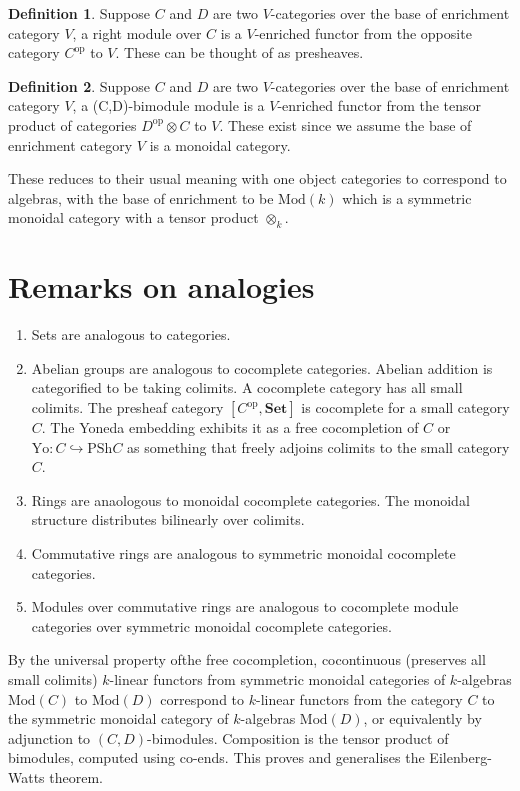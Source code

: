 \documentclass[10pt]{article}
\theoremstyle{plain}%
\theoremstyle{definition}
\newtheorem{definition}{Definition}[section]
\theoremstyle{remark}
\begin{document}
\begin{definition}
	Suppose $C$ and $D$ are two $V$-categories over the base of enrichment category $V$, a right module over $C$ is a $V$-enriched functor from the opposite category $C^\mathrm{op}$ to $V$.
	These can be thought of as presheaves.
\end{definition}

\begin{definition}
	Suppose $C$ and $D$ are two $V$-categories over the base of enrichment category $V$, a (C,D)-bimodule module is a $V$-enriched functor from the tensor product of categories $D^\mathrm{op} \otimes C$ to $V$. These exist since we assume the base of enrichment category $V$ is a monoidal category.
\end{definition}

These reduces to their usual meaning with one object categories to correspond to algebras, with the base of enrichment to be $\mathrm{Mod}(k)$ which is a symmetric monoidal category with a tensor product $\otimes_k$.

\section{Remarks on analogies}

\begin{enumerate}
	\item Sets are analogous to categories.
	\item Abelian groups are analogous to cocomplete categories. Abelian addition is categorified to be taking colimits. A cocomplete category has all small colimits. The presheaf category $[C^\mathrm{op}, \mathbf{Set}]$ is cocomplete for a small category $C$. The Yoneda embedding exhibits it as a free cocompletion of $C$ or $\mathrm{Yo} : C \hookrightarrow \mathrm{PSh}C$ as something that freely adjoins colimits to the small category $C$. 
	\item Rings are anaologous to monoidal cocomplete categories. The monoidal structure distributes bilinearly over colimits.
	\item Commutative rings are analogous to symmetric monoidal cocomplete categories.
	\item Modules over commutative rings are analogous to cocomplete module categories over symmetric monoidal cocomplete categories.
\end{enumerate}

By the universal property ofthe free cocompletion, cocontinuous (preserves all small colimits) $k$-linear functors from symmetric monoidal categories of $k$-algebras $\mathrm{Mod}(C)$ to $\mathrm{Mod}(D)$ correspond to $k$-linear functors from the category $C$ to the symmetric monoidal category of $k$-algebras $\mathrm{Mod}(D)$, or equivalently by adjunction to $(C,D)$-bimodules. Composition is the tensor product of bimodules, computed using co-ends. This proves and generalises the Eilenberg-Watts theorem.
\end{document}

